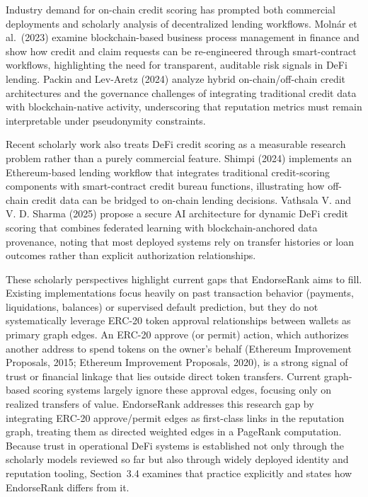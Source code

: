 Industry demand for on-chain credit scoring has prompted both commercial deployments and scholarly analysis of decentralized lending workflows. Moln\'{a}r et al.\ (2023) examine blockchain-based business process management in finance and show how credit and claim requests can be re-engineered through smart-contract workflows, highlighting the need for transparent, auditable risk signals in DeFi lending. Packin and Lev-Aretz (2024) analyze hybrid on-chain/off-chain credit architectures and the governance challenges of integrating traditional credit data with blockchain-native activity, underscoring that reputation metrics must remain interpretable under pseudonymity constraints.


Recent scholarly work also treats DeFi credit scoring as a measurable research problem rather than a purely commercial feature. Shimpi (2024) implements an Ethereum-based lending workflow that integrates traditional credit-scoring components with smart-contract credit bureau functions, illustrating how off-chain credit data can be bridged to on-chain lending decisions. Vathsala V. and V. D. Sharma (2025) propose a secure AI architecture for dynamic DeFi credit scoring that combines federated learning with blockchain-anchored data provenance, noting that most deployed systems rely on transfer histories or loan outcomes rather than explicit authorization relationships.


These scholarly perspectives highlight current gaps that EndorseRank aims to fill. Existing implementations focus heavily on past transaction behavior (payments, liquidations, balances) or supervised default prediction, but they do not systematically leverage ERC-20 token approval relationships between wallets as primary graph edges. An ERC-20 approve (or permit) action, which authorizes another address to spend tokens on the owner's behalf (Ethereum Improvement Proposals, 2015; Ethereum Improvement Proposals, 2020), is a strong signal of trust or financial linkage that lies outside direct token transfers. Current graph-based scoring systems largely ignore these approval edges, focusing only on realized transfers of value. EndorseRank addresses this research gap by integrating ERC-20 approve/permit edges as first-class links in the reputation graph, treating them as directed weighted edges in a PageRank computation. Because trust in operational DeFi systems is established not only through the scholarly models reviewed so far but also through widely deployed identity and reputation tooling, Section~3.4 examines that practice explicitly and states how EndorseRank differs from it.


